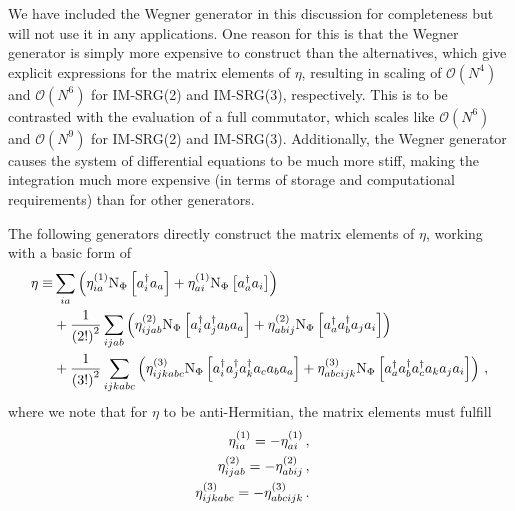 We have included the Wegner generator in this discussion for completeness
but will not use it in any applications.
One reason for this is that the Wegner generator is simply more expensive to construct
than the alternatives,
which give explicit expressions for the matrix elements of $\eta$,
resulting in scaling of $\mathcal{O}(N^4)$ and $\mathcal{O}(N^6)$ for IM-SRG(2) and IM-SRG(3),
respectively.
This is to be contrasted with the evaluation of a full commutator,
which scales like $\mathcal{O}(N^6)$ and $\mathcal{O}(N^9)$ for IM-SRG(2) and IM-SRG(3).
Additionally, the Wegner generator causes the system of differential equations
to be much more stiff,
making the integration much more expensive
(in terms of storage and computational requirements)
than for other generators.

The following generators directly construct the matrix elements of $\eta$, working with a basic form of
\begin{equation}
  \begin{split}
    \eta \equiv & \sum_{ia}\left(\eta^{(1)}_{ia} \text{N}_{\Phi}\left[a_{i}^{\dagger}a_{a}\right]
                                + \eta^{(1)}_{ai} \text{N}_{\Phi}\left[a_{a}^{\dagger}a_{i}\right]\right) \\
                  & + \frac{1}{{(2!)}^2} \sum_{ijab} \left(
                      \eta^{(2)}_{ijab} \text{N}_{\Phi}\left[a_{i}^{\dagger}a_{j}^{\dagger}a_{b}a_{a}\right]
                      + \eta^{(2)}_{abij} \text{N}_{\Phi}\left[a_{a}^{\dagger}a_{b}^{\dagger}a_{j}a_{i}\right]
                    \right) \\
                  & + \frac{1}{{(3!)}^2} \sum_{ijkabc} \left(
                      \eta^{(3)}_{ijkabc} \text{N}_{\Phi}\left[a_{i}^{\dagger}a_{j}^{\dagger}a_{k}^{\dagger}a_{c}a_{b}a_{a}\right]
                      + \eta^{(3)}_{abcijk} \text{N}_{\Phi}\left[a_{a}^{\dagger}a_{b}^{\dagger}a_{c}^{\dagger}a_{k}a_{j}a_{i}\right]
                    \right)\,,
  \end{split}
\end{equation}
where we note that for $\eta$ to be anti-Hermitian, the matrix elements must fulfill
\begin{subequations}
  \begin{align}
    \begin{split}
      \eta^{(1)}_{ia} &= - \eta^{(1)}_{ai}\,,
    \end{split} \\
    \begin{split}
      \eta^{(2)}_{ijab} &= - \eta^{(2)}_{abij}\,,
    \end{split} \\
    \begin{split}
      \eta^{(3)}_{ijkabc} &= - \eta^{(3)}_{abcijk}\,.
    \end{split}
  \end{align}
\end{subequations}
